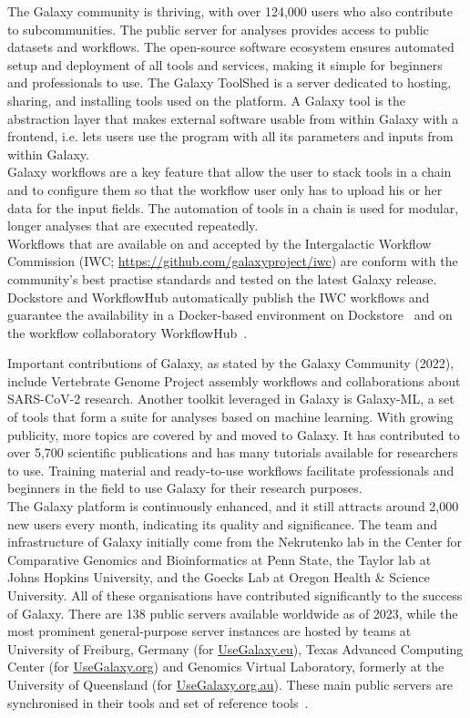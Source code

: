 The Galaxy community is thriving, with over 124,000 users who also contribute to subcommunities. The public server for analyses provides access to public datasets and workflows. The open-source software ecosystem ensures automated setup and deployment of all tools and services, making it simple for beginners and professionals to use. The Galaxy ToolShed is a server dedicated to hosting, sharing, and installing tools used on the platform. A Galaxy tool is the abstraction layer that makes external software usable from within Galaxy with a frontend, i.e. lets users use the program with all its parameters and inputs from within Galaxy. \\ 
Galaxy workflows are a key feature that allow the user to stack tools in a chain and to configure them so that the workflow user only has to upload his or her data for the input fields. The automation of tools in a chain is used for modular, longer analyses that are executed repeatedly. \\
Workflows that are available on and accepted by the Intergalactic Workflow Commission (IWC; \url{https://github.com/galaxyproject/iwc}) are conform with the community's best practise standards and tested on the latest Galaxy release. Dockstore and WorkflowHub automatically publish the \acs{IWC} workflows and guarantee the availability in a Docker-based environment on Dockstore~\cite{o2017dockstore} and on the workflow collaboratory WorkflowHub~\cite{goble2021implementing}.

Important contributions of Galaxy, as stated by the Galaxy Community (2022), include Vertebrate Genome Project assembly workflows and collaborations about \ac{SARS-CoV-2} research. Another toolkit leveraged in Galaxy is Galaxy-ML, a set of tools that form a suite for analyses based on machine learning. With growing publicity, more topics are covered by and moved to Galaxy. It has contributed to over 5,700 scientific publications and has many tutorials available for researchers to use. Training material and ready-to-use workflows facilitate professionals and beginners in the field to use Galaxy for their research purposes. \\
The Galaxy platform is continuously enhanced, and it still attracts around 2,000 new users every month, indicating its quality and significance. The team and infrastructure of Galaxy initially come from the Nekrutenko lab in the Center for Comparative Genomics and Bioinformatics at Penn State, the Taylor lab at Johns Hopkins University, and the Goecks Lab at Oregon Health \& Science University. All of these organisations have contributed significantly to the success of Galaxy. There are 138 public servers available worldwide as of 2023, while the most prominent general-purpose server instances are hosted by teams at University of Freiburg, Germany (for \href{https://usegalaxy.eu/}{UseGalaxy.eu}), Texas Advanced Computing Center (for \href{https://usegalaxy.org/}{UseGalaxy.org}) and Genomics Virtual Laboratory, formerly at the University of Queensland (for \href{https://usegalaxy.org.au/}{UseGalaxy.org.au}). These main public servers are synchronised in their tools and set of reference tools~\cite{10.1093/nar/gkac247}.

